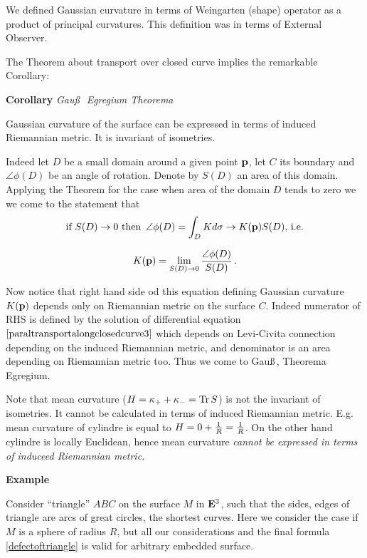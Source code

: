 \documentclass[12pt]{article}
\theoremstyle{theorem}
\numberwithin{equation}{section}
\begin{document}
{{We defined Gaussian curvature in terms of Weingarten (shape) 
operator as a product of principal curvatures.
This definition was in terms of External Observer. 

 The Theorem about transport over closed curve implies
the remarkable Corollary:

{\bf Corollary} {\it Gau\ss \,\, Egregium Theorema}

Gaussian curvature of the surface can be expressed in 
terms of induced Riemannian metric. It
is invariant of isometries.


\bigskip

Indeed
let  $D$ be a small domain around  a given point ${\bf p}$, 
let $C$ its boundary and
$\angle \phi(D)$ be an angle of rotation.   
Denote by $S(D)$ an area of this domain.
Applying the Theorem for the case when area of the domain $D$ 
tends to zero we  we come to the statement that
            $$
      \hbox{if $S(D)\to 0$ then \,} \angle\phi(D)=\int_D Kd\sigma\to K({\bf p})S(D),\,{\rm i.e.}
            $$

\begin{equation}\label{egregium1}
K({\bf p})=\lim_{S(D)\to 0}{\angle\phi(D)\over S(D)}\,.
\end{equation}

Now notice that  right hand side od this equation defining 
Gaussian curvature $K({\bf p})$ depends only on Riemannian
metric on the surface $C$. Indeed numerator of RHS is 
defined by the solution of differential equation
$\eqref{paraltransportalongclosedcurve3}$ which depends on 
Levi-Civita connection depending on
the induced Riemannian metric, and denominator is an area depending 
on Riemannian metric too.
Thus we come to Gau\ss\,, Theorema Egregium.

{\footnotesize Note that   
mean curvature ($H={\kappa}_++{\kappa}_-={\rm Tr\,}S$) 
is not the invariant of isometries.  It cannot be calculated
in terms of induced Riemannian metric. E.g. 
mean curvature of cylindre is equal to $H=0+{1\over R}={1\over R}$.
On the other hand cylindre is locally Euclidean,
hence mean curvature {\it cannot be expressed in terms of induceed
Riemannian metric.}}



\bigskip

{\footnotesize

{\bf Example}    

Consider  ``triangle''   $ABC$ on the surface $M$ in ${\bf E}^3$,
such that 
  the sides, edges  of triangle are arcs of great circles,
the shortest curves.
Here we consider the case if $M$ is a sphere of radius $R$,
but all our considerations and the final formula
\eqref{defectoftriangle} is valid for arbitrary embedded surface.




}}}
\end{document}
